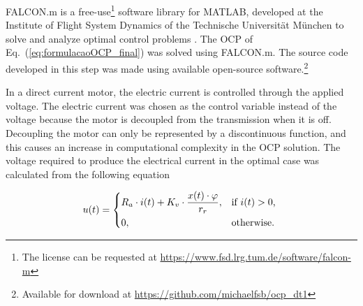 FALCON.m is a free-use\footnote{The license can be requested at \url{https://www.fsd.lrg.tum.de/software/falcon-m}} software library for MATLAB, 
developed at the Institute of Flight System Dynamics of the Technische Universit{\"a}t M{\"u}nchen to solve and analyze optimal control problems \citep{manual:Falcon}. 
The OCP of Eq.~(\ref{eq:formulacaoOCP_final}) was solved using FALCON.m. The source code developed in this step was made using available open-source software.\footnote{Available for download at \url{https://github.com/michaelfsb/ocp_dt1}}

In a direct current motor, the electric current is controlled through the applied voltage. 
The electric current was chosen as the control variable instead of the voltage because the motor is decoupled from the transmission when it is off. 
Decoupling the motor can only be represented by a discontinuous function, and this causes an increase in computational complexity in the OCP solution.
The voltage required to produce the electrical current in the optimal case was calculated from the following equation

\begin{equation}
    u(t)=\begin{dcases*}
      R_a \cdot i(t) + K_v \cdot \frac{x(t) \cdot \varphi}{r_r} , & \text{if $i(t)>0$},\\
      0, & \text{otherwise}.
    \end{dcases*}
  \end{equation}